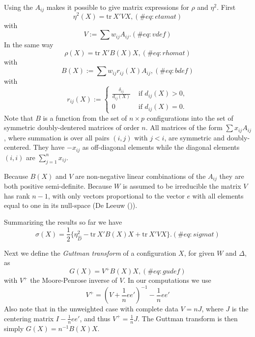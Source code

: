 \documentclass[
  12pt,
  letterpaper,
  DIV=11,
  numbers=noendperiod]{scrartcl}
\theoremstyle{plain}
\theoremstyle{remark}
\begin{document}
Using the \(A_{ij}\) makes it possible to give matrix expressions for
\(\rho\) and \(\eta^2\). First \begin{equation}
\eta^2(X)=\text{tr}\ X'VX,
(\#eq:etamat)
\end{equation} with \begin{equation}
V:=\sum   w_{ij}A_{ij}.
(\#eq:vdef)
\end{equation} In the same way \begin{equation}
\rho(X)=\text{tr}\ X'B(X)X,
(\#eq:rhomat)
\end{equation} with \begin{equation}
B(X):=\sum   w_{ij}r_{ij}(X)A_{ij},
(\#eq:bdef)
\end{equation} with \begin{equation}
r_{ij}(X):=\begin{cases}\frac{\delta_{ij}}{d_{ij}(X)}&\text{ if }d_{ij}(X)>0,\\
0&\text{ if }d_{ij}(X)=0.
\end{cases}
\end{equation} Note that \(B\) is a function from the set of
\(n\times p\) configurations into the set of symmetric doubly-dentered
matrices of order \(n\). All matrices of the form \(\sum x_{ij}A_{ij}\),
where summation is over all pairs \((i,j)\) with \(j<i\), are symmetric
and doubly-centered. They have \(-x_{ij}\) as off-diagonal elements
while the diagonal elements \((i,i)\) are \(\sum_{j=1}^nx_{ij}\).

Because \(B(X)\) and \(V\) are non-negative linear combinations of the
\(A_{ij}\) they are both positive semi-definite. Because \(W\) is
assumed to be irreducible the matrix \(V\) has rank \(n-1\), with only
vectors proportional to the vector \(e\) with all elements equal to one
in its null-space (De Leeuw ()).

Summarizing the results so far we have \begin{equation}
\sigma(X)=\frac12\{\eta_{\hat D}^2-\text{tr}\ X'B(X)X+\text{tr}\ X'VX\}.
(\#eq:sigmat)
\end{equation}

Next we define the \emph{Guttman transform} of a configuration \(X\),
for given \(W\) and \(\Delta\), as \begin{equation}
G(X)=V^+B(X)X,
(\#eq:gudef)
\end{equation} with \(V^+\) the Moore-Penrose inverse of \(V\). In our
computations we use \begin{equation}
V^+=(V+\frac{1}{n}ee')^{-1}-\frac{1}{n}ee'
\end{equation} Also note that in the unweighted case with complete data
\(V=nJ\), where \(J\) is the centering matrix \(I-\frac{1}{n}ee'\), and
thus \(V^+=\frac{1}{n}J\). The Guttman transform is then simply
\(G(X)=n^{-1}B(X)X\).
\end{document}
